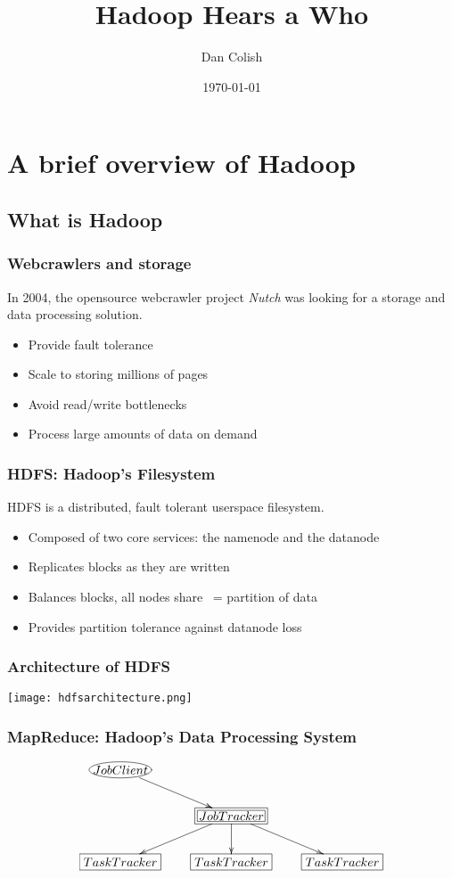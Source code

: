 \documentclass{beamer}
\title{Hadoop Hears a Who}
\author{Dan Colish}
\date{\today}
\begin{document}
\frame{\titlepage}

\section{A brief overview of Hadoop}
\subsection{What is Hadoop}

\frame
{
  \frametitle{Webcrawlers and storage}
  In 2004, the opensource webcrawler project \emph{Nutch} was looking for a
  storage and data processing solution.

  \begin{itemize}
    \item Provide fault tolerance
    \item Scale to storing millions of pages
    \item Avoid read/write bottlenecks
    \item Process large amounts of data on demand
  \end{itemize}

}


\frame
{
  \frametitle{HDFS: Hadoop's Filesystem}

  HDFS is a distributed, fault tolerant userspace filesystem.

  \begin{itemize}
    \item Composed of two core services: the namenode and the datanode
    \item Replicates blocks as they are written
    \item Balances blocks, all nodes share ~= partition of data
    \item Provides partition tolerance against datanode loss
  \end {itemize}

}


\frame
{
  \frametitle{Architecture of HDFS}
  \texttt{[image: hdfsarchitecture.png]}
  \cite{hadoopdocs}
}

\frame
{
  \frametitle{MapReduce: Hadoop's Data Processing System}
  \begin{displaymath}
    \xymatrix{ 
      *+[Fe:blue]{JobClient} \ar[dr] & & \\
      & *+[F=:magenta]{JobTracker} \ar[dl] \ar[d] \ar[dr] & \\
      *+[F]{TaskTracker} & *+[F]{TaskTracker} & *+[F]{TaskTracker}
    }
  \end{displaymath}
}
\end{document}
